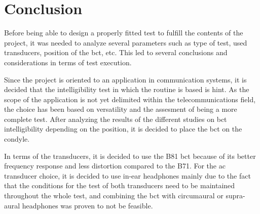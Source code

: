 \section{Conclusion}
Before being able to design a properly fitted test to fulfill the contents of the project, it was needed to analyze several parameters such as type of test, used transducers, position of the \gls{bct}, etc. This led to several conclusions and considerations in terms of test execution.

Since the project is oriented to an application in communication systems, it is decided that the intelligibility test in which the routine is based is \gls{hint}. As the scope of the application is not yet delimited within the telecommunications field, the choice has been based on versatility and the assesment of being a more complete test. After analyzing the results of the different studies on \gls{bct} intelligibility depending on the position, it is decided to place the \gls{bct} on the condyle.

In terms of the transducers, it is decided to use the B81 \gls{bct} because of its better frequency response and less distortion compared to the B71. For the \gls{ac} transducer choice, it is decided to use in-ear headphones mainly due to the fact that the conditions for the test of both transducers need to be maintained throughout the whole test, and combining the \gls{bct} with circumaural or supra-aural headphones was proven to not be feasible.

